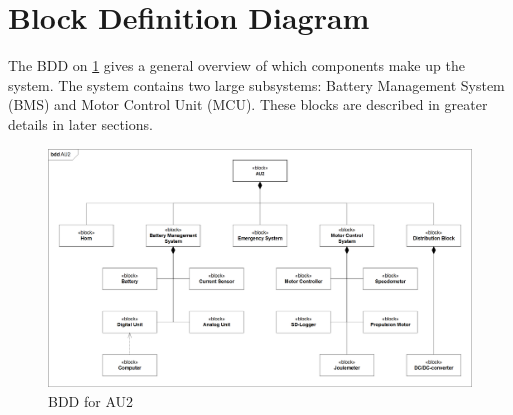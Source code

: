 \section{Block Definition Diagram}
The BDD on \ref{fig:BDD} gives a general overview of which components make up the system. The system contains two large subsystems: Battery Management System (BMS) and Motor Control Unit (MCU). These blocks are described in greater details in later sections.

\begin{figure}[H]
	\centering
	\includegraphics[width=1\linewidth]{Architecture/Diagrams/BDD_AU2}
	\caption{BDD for AU2}
	\label{fig:BDD}
\end{figure}